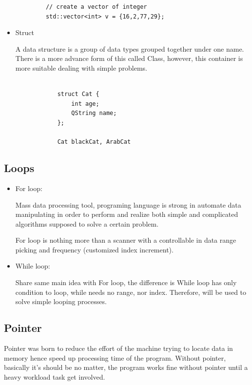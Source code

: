 \documentclass[english]{article}
\begin{document}
{\begin{itemize}
\begin{lstlisting}
			// create a vector of integer
			std::vector<int> v = {16,2,77,29};
		\end{lstlisting}
	\end{itemize}
	
	\begin{itemize}
		\item Struct
		
		A data structure is a group of data types grouped together under one name. There is a more advance form of this called Class, however, this container is more suitable dealing with simple problems.
		
		\lstset{language=C++}
		\begin{lstlisting}
		
			struct Cat {
				int age;
				QString name;
			};
			
			Cat blackCat, ArabCat
		\end{lstlisting}
	\end{itemize}



\subsection{Loops}

	\begin{itemize}
		\item For loop:
		
		Mass data processing tool, programing language is strong in automate data manipulating in order to perform and realize both simple and complicated algorithms supposed to solve a certain problem. 
		
		For loop is nothing more than a scanner with a controllable in data range picking and frequency (customized index increment).
		
		\item While loop:
		
		Share same main idea with For loop, the difference is While loop has only condition to loop, while needs no range, nor index. Therefore, will be used to solve simple looping processes.
		
		
	\end{itemize}

\newpage

\subsection{Pointer}

Pointer was born to reduce the effort of the machine trying to locate data in memory hence speed up processing time of the program. Without pointer, basically it's should be no matter, the program works fine without pointer until a heavy workload task get involved.

}
\end{document}
